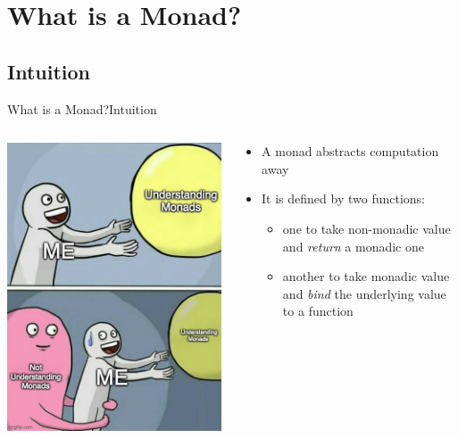 \documentclass{beamer}
\begin{document}
  \section{What is a Monad?}
  \subsection{Intuition}
  \begin{frame}[fragile]{What is a Monad?}{Intuition}
    \begin{columns}
      \begin{column}{.4\textwidth}
        \includegraphics[width=\textwidth]{monad-meme}
      \end{column}
      \begin{column}{.4\textwidth}
        \begin{itemize}
          \item A monad abstracts computation away
          \item It is defined by two functions:
            \begin{itemize}
              \item one to take non-monadic value and \textit{return} a monadic one
              \item another to take monadic value and \textit{bind} the underlying value to a function
            \end{itemize}
        \end{itemize}
      \end{column}
    \end{columns}
  \end{frame}
\end{document}
